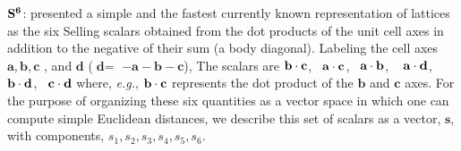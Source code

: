 \documentclass[preprint]{iucr}              %
\numberwithin{equation}{section}
\newcommand{\SVI}[0]{$\bf{S^{6}}$}
\newcommand{\vdotv}[2]{${{\bf #1 \cdot #2}}$}
\begin{document}
		\SVI{}:  
			presented a simple and the fastest currently
			known representation of lattices as the six Selling 
			scalars obtained from the dot products of the unit cell axes in addition to the negative of their sum (a body diagonal). Labeling 
			the cell axes ${\textbf{a}, \textbf{b}, \textbf{c}}$ , and ${\textbf{d}}$ (${\textbf{d}} =$ $-{\textbf{a}}-\!{\textbf{b}}-\!{\textbf{c}}$), 
			The scalars are	\vdotv{\textbf{b}}{\textbf{c}},~ \vdotv{\textbf{a}}{\textbf{c}},~ \vdotv{\textbf{a}}{\textbf{b}},
			~ \vdotv{\textbf{a}}{\textbf{d}},~ \vdotv{\textbf{b}}{\textbf{d}},~ \vdotv{\textbf{c}}{\textbf{d}} where,
			{\it e.g.},
			\vdotv{\textbf{b}}{\textbf{c}} represents the dot product of the ${\textbf{b}}$  and ${\textbf{c}}$  axes. For the purpose of organizing these six quantities as a vector space in which one can compute simple Euclidean distances, we describe this set of scalars 
			as a vector, ${\textbf{s}}$, with components, $ {s}_1, {s}_2, {s}_3, {s}_4, {s}_5, {s}_6 $.\\
\end{document}

